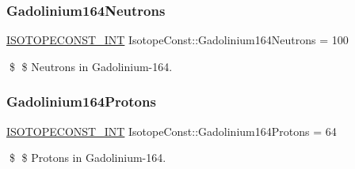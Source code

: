 \subsubsection{\texorpdfstring{Gadolinium164\+Neutrons}{Gadolinium164Neutrons}}
{\footnotesize\ttfamily \mbox{\hyperlink{group___isotope_const-_macros_ga5f18360b3e99483a35c32d789e62621c}{I\+S\+O\+T\+O\+P\+E\+C\+O\+N\+S\+T\+\_\+\+I\+NT}} Isotope\+Const\+::\+Gadolinium164\+Neutrons = 100}

\$ \$ Neutrons in Gadolinium-\/164. \mbox{\label{group___isotope_const-_gadolinium-_gd164_ga1b2d25132b2e5e0bd081a748221f94dd}} 
\subsubsection{\texorpdfstring{Gadolinium164\+Protons}{Gadolinium164Protons}}
{\footnotesize\ttfamily \mbox{\hyperlink{group___isotope_const-_macros_ga5f18360b3e99483a35c32d789e62621c}{I\+S\+O\+T\+O\+P\+E\+C\+O\+N\+S\+T\+\_\+\+I\+NT}} Isotope\+Const\+::\+Gadolinium164\+Protons = 64}

\$ \$ Protons in Gadolinium-\/164. 